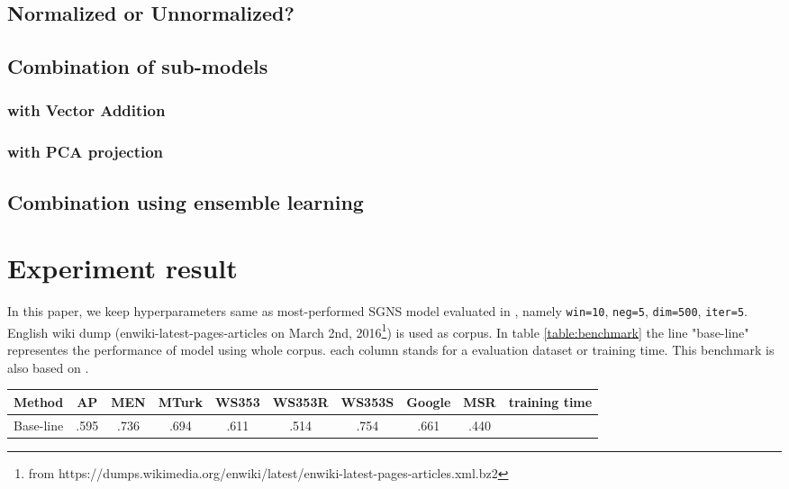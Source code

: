 \documentclass[11pt,a4paper]{article}
\begin{document}
  \subsection{Normalized or Unnormalized?}
  \subsection{Combination of sub-models}
  \subsubsection{with Vector Addition}
  \subsubsection{with PCA projection}
  \subsubsection{}
  \subsection{Combination using ensemble learning}

\section{Experiment result}
In this paper, we keep hyperparameters same as most-performed SGNS model evaluated in \cite{levy2015improving}, namely \verb|win=10|, \verb|neg=5|, \verb|dim=500|, \verb|iter=5|. English wiki dump (enwiki-latest-pages-articles on March 2nd, 2016\footnote{from https://dumps.wikimedia.org/enwiki/latest/enwiki-latest-pages-articles.xml.bz2}) is used as corpus. In table \ref{table:benchmark} the line "base-line" representes the performance of model using whole corpus. each column stands for a evaluation dataset or training time. This benchmark is also based on \cite{levy2015improving}.
\begin{table*}
\caption{Performance and training time of different scalable strategies}
\begin{tabular}{c|cccccccc|c}
\hline
Method    & AP   & MEN  & MTurk & WS353 & WS353R & WS353S & Google & MSR  & training time\\ \hline
Base-line & .595 & .736 & .694  & .611  & .514   & .754   & .661   & .440 & \\ \hline
\end{tabular}
\label{table:benchmark}
\end{table*}
\end{document}
